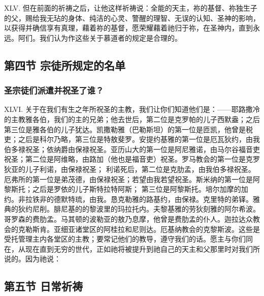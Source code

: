 XLV. 但在前面的祈祷之后，让他这样祈祷说：全能的天主，祢的基督、祢独生子的父，赐给我无玷的身体、纯洁的心灵、警醒的理智、无误的认知、圣神的影响，以获得并确信享有真理，藉着祢的基督，愿荣耀藉着祂归于祢，在圣神内，直到永远。阿们。我们认为作这些关于慕道者的规定是合理的。\par


\subsection{第四节 宗徒所规定的名单}


\subsubsection{圣宗徒们派遣并祝圣了谁？}

XLVI. 关于在我们有生之年所祝圣的主教，我们让你们知道他们是：——耶路撒冷的主教雅各伯，我们的主的兄弟；他去世后，第二位是克罗帕的儿子西默盎；之后第三位是雅各伯的儿子犹达。凯撒勒雅（巴勒斯坦）的第一位是匝凯，他曾是税吏；之后是科尔乃略，第三位是特敖斐罗。安提约基雅的第一位是厄瓦狄约，由我伯多禄祝圣；依纳爵由保禄祝圣。亚历山大的第一位是阿尼雅诺，由马尔谷福音吏祝圣；第二位是阿维略，由路加（他也是福音吏）祝圣。罗马教会的第一位是克罗狄亚的儿子利诺，由保禄祝圣； 利诺死后，第二位是克肋孟，由我伯多禄祝圣。厄弗所的第一位是弟茂德，由保禄祝圣；若望由我若望祝圣。斯米纳的第一位是阿黎斯托；之后是罗依的儿子斯特拉特阿斯； 第三位是阿黎斯托。培尔加摩的加约。非拉铁非的德默特琉，由我。恳克勒雅的路基约，由保禄。克里特的弟铎。雅典的狄约尼削。腓尼基的的黎波里的玛拉托内。夫黎基雅的劳狄刻雅的阿尔希波。哥罗森的费肋孟。马其顿的波勒亚的敖乃息摩，他曾是费肋孟的仆人。迦拉达众教会的克勒斯肯。亚细亚诸堂区的阿桂拉和尼则达。厄基纳教会的克黎斯波。这些是受托管理主内各堂区的主教；要常记他们的教导，遵守我们的话。愿主与你们同在，从现在直到无穷的世代，正如祂将被提升到祂自己的天主和父那里时对我们所说的。因为祂说： \par


\subsection{第五节 日常祈祷}

